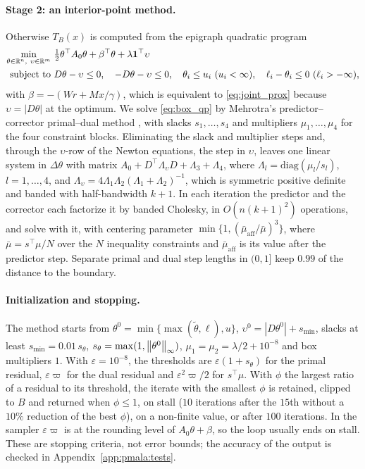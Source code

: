 \paragraph{Stage 2: an interior-point method.} Otherwise $T_B(x)$ is computed from the epigraph quadratic program
\begin{equation}
\begin{aligned}
\min_{\theta \in \mathbb{R}^n,\ \upsilon \in \mathbb{R}^m}\ & \tfrac12\theta^\top A_0\theta + \beta^\top\theta + \lambda\mathbf 1^\top\upsilon \\
\text{subject to}\ & D\theta - \upsilon \le 0, \quad -D\theta - \upsilon \le 0, \quad \theta_i \le u_i\ (u_i < \infty), \quad \ell_i - \theta_i \le 0\ (\ell_i > -\infty),
\end{aligned}
\label{eq:box_qp}
\end{equation}
with $\beta = -(Wr + Mx/\gamma)$, which is equivalent to \eqref{eq:joint_prox} because $\upsilon = |D\theta|$ at the optimum. We solve \eqref{eq:box_qp} by Mehrotra's predictor--corrector primal--dual method \citep{mehrotra1992implementation}, with slacks $s_1, \ldots, s_4$ and multipliers $\mu_1, \ldots, \mu_4$ for the four constraint blocks. Eliminating the slack and multiplier steps and, through the $\upsilon$-row of the Newton equations, the step in $\upsilon$, leaves one linear system in $\Delta\theta$ with matrix $A_0 + D^\top \Lambda_\upsilon D + \Lambda_3 + \Lambda_4$, where $\Lambda_l = \mathrm{diag}(\mu_l/s_l)$, $l = 1, \ldots, 4$, and $\Lambda_\upsilon = 4\Lambda_1\Lambda_2(\Lambda_1 + \Lambda_2)^{-1}$, which is symmetric positive definite and banded with half-bandwidth $k+1$. In each iteration the predictor and the corrector each factorize it by banded Cholesky, in $O(n(k+1)^2)$ operations, and solve with it, with centering parameter $\min\{1, (\bar\mu_{\mathrm{aff}}/\bar\mu)^3\}$, where $\bar\mu = s^\top\mu/N$ over the $N$ inequality constraints and $\bar\mu_{\mathrm{aff}}$ is its value after the predictor step. Separate primal and dual step lengths in $(0, 1]$ keep $0.99$ of the distance to the boundary.

\paragraph{Initialization and stopping.} The method starts from $\theta^0 = \min\{\max(\tilde\theta, \ell), u\}$, $\upsilon^0 = |D\theta^0| + s_{\min}$, slacks at least $s_{\min} = 0.01\,s_\theta$, $s_\theta = \max(1, \left\lVert\theta^0\right\rVert_\infty)$, $\mu_1 = \mu_2 = \lambda/2 + 10^{-8}$ and box multipliers $1$. With $\varepsilon = 10^{-8}$, the thresholds are $\varepsilon(1 + s_\theta)$ for the primal residual, $\varepsilon\varpi$ for the dual residual and $\varepsilon^2\varpi/2$ for $s^\top\mu$. With $\phi$ the largest ratio of a residual to its threshold, the iterate with the smallest $\phi$ is retained, clipped to $B$ and returned when $\phi \le 1$, on stall ($10$ iterations after the $15$th without a $10\%$ reduction of the best $\phi$), on a non-finite value, or after $100$ iterations. In the sampler $\varepsilon\varpi$ is at the rounding level of $A_0\theta + \beta$, so the loop usually ends on stall. These are stopping criteria, not error bounds; the accuracy of the output is checked in Appendix~\ref{app:pmala:tests}.

